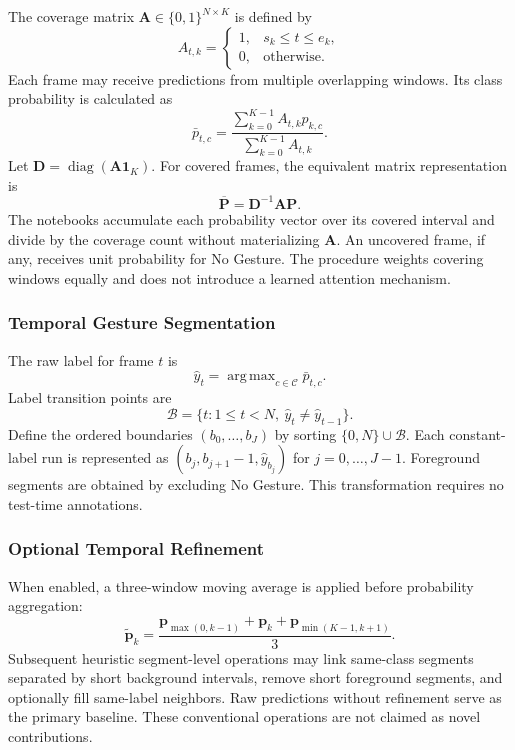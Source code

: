 \documentclass{ieeeaccess}
\DeclareMathOperator*{\argmax}{arg\,max}
\begin{document}
The coverage matrix $\mathbf A\in\{0,1\}^{N\times K}$ is defined by
\begin{equation}
A_{t,k}=
\begin{cases}
1,&s_k\leq t\leq e_k,\\
0,&\text{otherwise}.
\end{cases}
\end{equation}
Each frame may receive predictions from multiple overlapping windows. Its class probability is calculated as
\begin{equation}
\bar p_{t,c}=
\frac{\sum_{k=0}^{K-1}A_{t,k}p_{k,c}}
{\sum_{k=0}^{K-1}A_{t,k}}.
\label{eq:aggregation}
\end{equation}
Let $\mathbf D=\operatorname{diag}(\mathbf A\mathbf 1_K)$. For covered frames, the equivalent matrix representation is
\begin{equation}
\overline{\mathbf P}=\mathbf D^{-1}\mathbf A\mathbf P.
\label{eq:matrix_aggregation}
\end{equation}
The notebooks accumulate each probability vector over its covered interval and divide by the coverage count without materializing $\mathbf A$. An uncovered frame, if any, receives unit probability for No Gesture. The procedure weights covering windows equally and does not introduce a learned attention mechanism.

\subsubsection{Temporal Gesture Segmentation}
The raw label for frame $t$ is
\begin{equation}
\hat y_t=\argmax_{c\in\mathcal C}\bar p_{t,c}.
\end{equation}
Label transition points are
\begin{equation}
\mathcal B=\{t:1\leq t<N,\ \hat y_t\neq\hat y_{t-1}\}.
\end{equation}
Define the ordered boundaries $(b_0,\ldots,b_J)$ by sorting $\{0,N\}\cup\mathcal B$. Each constant-label run is represented as $(b_j,b_{j+1}-1,\hat y_{b_j})$ for $j=0,\ldots,J-1$. Foreground segments are obtained by excluding No Gesture. This transformation requires no test-time annotations.

\subsubsection{Optional Temporal Refinement}
When enabled, a three-window moving average is applied before probability aggregation:
\begin{equation}
\tilde{\mathbf p}_k=
\frac{\mathbf p_{\max(0,k-1)}+\mathbf p_k+
\mathbf p_{\min(K-1,k+1)}}{3}.
\end{equation}
Subsequent heuristic segment-level operations may link same-class segments separated by short background intervals, remove short foreground segments, and optionally fill same-label neighbors. Raw predictions without refinement serve as the primary baseline. These conventional operations are not claimed as novel contributions.
\end{document}

